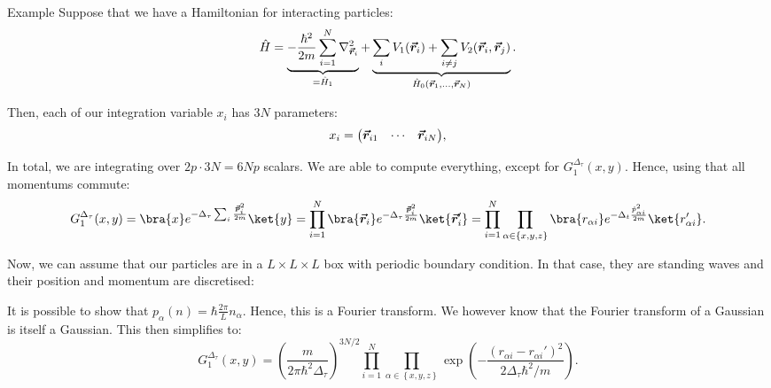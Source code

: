 \documentclass[a4paper]{article}
\begin{document}
\begin{parag}{Example}
    Suppose that we have a Hamiltonian for interacting particles: 
    \[\hat{H} = \underbrace{-\frac{\hbar^2}{2m}\sum_{i=1}^{N} \nabla^2_{\bvec{r}_i}}_{=\hat{H}_1} + \underbrace{\sum_{i}  V_1\left(\bvec{r}_i\right) + \sum_{i \neq j} V_2\left(\bvec{r}_i, \bvec{r}_j\right)}_{\hat{H}_0\left(\bvec{r}_1, \ldots, \bvec{r}_N\right)}.\]

    Then, each of our integration variable $x_i$ has $3N$ parameters: 
    \[x_i = \begin{pmatrix} \bvec{r}_{i1} & \cdots & \bvec{r}_{iN} \end{pmatrix},\]

    In total, we are integrating over $2p \cdot 3N = 6 Np$ scalars. We are able to compute everything, except for $G_1^{\Delta_{\tau}}\left(x, y\right)$. Hence, using that all momentums commute: 
    \[G_1^{\Delta_{\tau}}\left(x, y\right) = \bra{x} e^{- \Delta_{\tau} \sum_{i} \frac{\bvec{p}_i^2}{2m}} \ket{y} = \prod_{i=1}^{N} \bra{\bvec{r}_i} e^{-\Delta_{\tau} \frac{\bvec{p}_i^2}{2m}} \ket{\bvec{r}_i'} = \prod_{i=1}^{N} \prod_{\alpha \in \left\{x, y, z\right\}} \bra{r_{\alpha i}} e^{-\Delta_t \frac{\hat{p}_{\alpha i}^2}{2m}} \ket{r_{\alpha i}'}.\]

    Now, we can assume that our particles are in a $L \times L \times L$ box with periodic boundary condition. In that case, they are standing waves and their position and momentum are discretised: 
    
    It is possible to show that $p_{\alpha}\left(n\right) = \hbar \frac{2\pi}{L} n_{\alpha}$. Hence, this is a Fourier transform. We however know that the Fourier transform of a Gaussian is itself a Gaussian. This then simplifies to:
    \[G_1^{\Delta_{\tau}}\left(x, y\right) = \left(\frac{m}{2 \pi \hbar^2 \Delta_{\tau}}\right)^{3N/2} \prod_{i=1}^{N} \prod_{\alpha \in \left\{x, y, z\right\}} \exp\left(-\frac{\left(r_{\alpha i} - r_{\alpha i}'\right)^2}{2 \Delta_{\tau} \hbar^2 / m}\right).\]


\end{parag}
\end{document}
